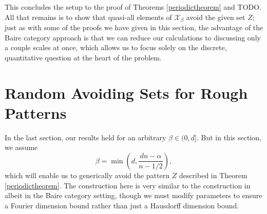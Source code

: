 \documentclass[12pt,reqno]{article}
\numberwithin{equation}{section}
\numberwithin{theorem}{section}
\begin{document}
This concludes the setup to the proof of Theorems \ref{periodictheorem} and TODO. All that remains is to show that quasi-all elements of $\mathcal{X}_\beta$ avoid the given set $Z$; just as with some of the proofs we have given in this section, the advantage of the Baire category approach is that we can reduce our calculations to discussing only a couple scales at once, which allows us to focus solely on the discrete, quantitative question at the heart of the problem.

\section{Random Avoiding Sets for Rough Patterns}

In the last section, our results held for an arbitrary $\beta \in (0,d]$. But in this section, we assume
%
\[ \beta = \min \left( d, \frac{dn - \alpha}{n - 1/2} \right), \]
%
which will enable us to generically avoid the pattern $Z$ described in Theorem \ref{periodictheorem}. The construction here is very similar to the construction in \cite{OurPaper} albeit in the Baire category setting, though we must modify parameters to ensure a Fourier dimension bound rather than just a Hausdorff dimension bound.
\end{document}
